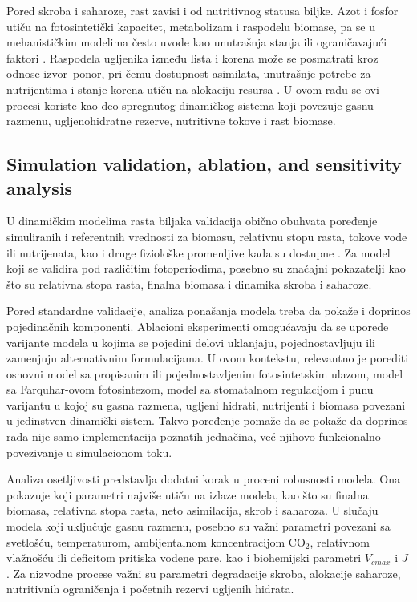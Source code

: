 \documentclass[a4paper,fleqn]{cas-dc}
\begin{document}
Pored skroba i saharoze, rast zavisi i od nutritivnog statusa biljke. Azot i fosfor utiču na fotosintetički kapacitet, metabolizam i raspodelu biomase, pa se u mehanističkim modelima često uvode kao unutrašnja stanja ili ograničavajući faktori \cite{Gastal2002,Xu2012,Barber1995,Shen2011,Carstensen2018}. Raspodela ugljenika između lista i korena može se posmatrati kroz odnose izvor--ponor, pri čemu dostupnost asimilata, unutrašnje potrebe za nutrijentima i stanje korena utiču na alokaciju resursa \cite{Marcelis1996,Feller2015,Louarn2020}. U ovom radu se ovi procesi koriste kao deo spregnutog dinamičkog sistema koji povezuje gasnu razmenu, ugljenohidratne rezerve, nutritivne tokove i rast biomase.

\subsection{Simulation validation, ablation, and sensitivity analysis}

U dinamičkim modelima rasta biljaka validacija obično obuhvata poređenje simuliranih i referentnih vrednosti za biomasu, relativnu stopu rasta, tokove vode ili nutrijenata, kao i druge fiziološke promenljive kada su dostupne \cite{Wallach2018,Holzworth2014,Jones2003,deWit2019}. Za model koji se validira pod različitim fotoperiodima, posebno su značajni pokazatelji kao što su relativna stopa rasta, finalna biomasa i dinamika skroba i saharoze.

Pored standardne validacije, analiza ponašanja modela treba da pokaže i doprinos pojedinačnih komponenti. Ablacioni eksperimenti omogućavaju da se uporede varijante modela u kojima se pojedini delovi uklanjaju, pojednostavljuju ili zamenjuju alternativnim formulacijama. U ovom kontekstu, relevantno je porediti osnovni model sa propisanim ili pojednostavljenim fotosintetskim ulazom, model sa Farquhar-ovom fotosintezom, model sa stomatalnom regulacijom i punu varijantu u kojoj su gasna razmena, ugljeni hidrati, nutrijenti i biomasa povezani u jedinstven dinamički sistem. Takvo poređenje pomaže da se pokaže da doprinos rada nije samo implementacija poznatih jednačina, već njihovo funkcionalno povezivanje u simulacionom toku.

Analiza osetljivosti predstavlja dodatni korak u proceni robusnosti modela. Ona pokazuje koji parametri najviše utiču na izlaze modela, kao što su finalna biomasa, relativna stopa rasta, neto asimilacija, skrob i saharoza. U slučaju modela koji uključuje gasnu razmenu, posebno su važni parametri povezani sa svetlošću, temperaturom, ambijentalnom koncentracijom CO$_2$, relativnom vlažnošću ili deficitom pritiska vodene pare, kao i biohemijski parametri $V_{cmax}$ i $J$. Za nizvodne procese važni su parametri degradacije skroba, alokacije saharoze, nutritivnih ograničenja i početnih rezervi ugljenih hidrata.
\end{document}

